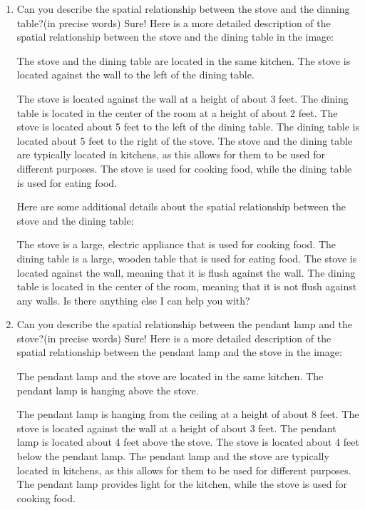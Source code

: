 \begin{enumerate}
    \item Can you describe the spatial relationship between the stove and the dinning table?(in precise words)
    \subitem 
    Sure! Here is a more detailed description of the spatial relationship between the stove and the dining table in the image:
    
    The stove and the dining table are located in the same kitchen. The stove is located against the wall to the left of the dining table.
    
    The stove is located against the wall at a height of about 3 feet.
    The dining table is located in the center of the room at a height of about 2 feet.
    The stove is located about 5 feet to the left of the dining table.
    The dining table is located about 5 feet to the right of the stove.
    The stove and the dining table are typically located in kitchens, as this allows for them to be used for different purposes. The stove is used for cooking food, while the dining table is used for eating food.
    
    Here are some additional details about the spatial relationship between the stove and the dining table:
    
    The stove is a large, electric appliance that is used for cooking food.
    The dining table is a large, wooden table that is used for eating food.
    The stove is located against the wall, meaning that it is flush against the wall.
    The dining table is located in the center of the room, meaning that it is not flush against any walls.
    Is there anything else I can help you with?
    \item Can you describe the spatial relationship between the pendant lamp and the stove?(in precise words)
    \subitem 
    Sure! Here is a more detailed description of the spatial relationship between the pendant lamp and the stove in the image:
    
    The pendant lamp and the stove are located in the same kitchen. The pendant lamp is hanging above the stove.
    
    The pendant lamp is hanging from the ceiling at a height of about 8 feet.
    The stove is located against the wall at a height of about 3 feet.
    The pendant lamp is located about 4 feet above the stove.
    The stove is located about 4 feet below the pendant lamp.
    The pendant lamp and the stove are typically located in kitchens, as this allows for them to be used for different purposes. The pendant lamp provides light for the kitchen, while the stove is used for cooking food.
    

\end{enumerate}
